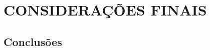 
\chapter{\normalsize{CONSIDERAÇÕES FINAIS}} \label{cap:conclusao}

\thispagestyle{empty}


\section{Conclusões}

%
%
%

